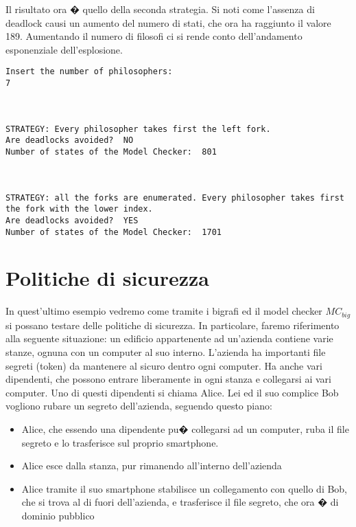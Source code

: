 Il risultato ora � quello della seconda strategia. Si noti come l'assenza di deadlock causi un aumento del numero di stati, che ora ha raggiunto il valore 189. Aumentando il numero di filosofi ci si rende conto dell'andamento esponenziale dell'esplosione.

\begin{lstlisting}
Insert the number of philosophers: 
7



STRATEGY: Every philosopher takes first the left fork.
Are deadlocks avoided?	NO
Number of states of the Model Checker:	801



STRATEGY: all the forks are enumerated. Every philosopher takes first the fork with the lower index.
Are deadlocks avoided?	YES
Number of states of the Model Checker:	1701
\end{lstlisting}





\section{Politiche di sicurezza}\label{sec:secureBuilding}
In quest'ultimo esempio vedremo come tramite i bigrafi ed il model checker $MC_{big}$ si possano testare delle politiche di sicurezza. In particolare, faremo riferimento alla seguente situazione: un edificio appartenente ad un'azienda contiene varie stanze, ognuna con un computer al suo interno. L'azienda ha importanti file segreti (token) da mantenere al sicuro dentro ogni computer. Ha anche vari dipendenti, che possono entrare liberamente in ogni stanza e collegarsi ai vari computer. Uno di questi dipendenti si chiama Alice.
Lei ed il suo complice Bob vogliono rubare un segreto dell'azienda, seguendo questo piano:

\begin{itemize}
	\item
	Alice, che essendo una dipendente pu� collegarsi ad un computer, ruba il file segreto e lo trasferisce sul proprio smartphone.
	\item
	Alice esce dalla stanza, pur rimanendo all'interno dell'azienda
	\item
	Alice tramite il suo smartphone stabilisce un collegamento con quello di Bob, che si trova al di fuori dell'azienda, e trasferisce il file segreto, che ora � di dominio pubblico
\end{itemize}

